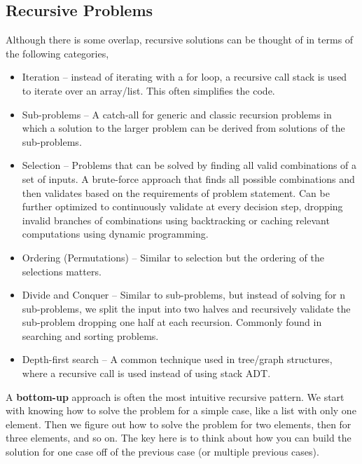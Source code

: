 \documentclass{article}
\begin{document}
    \subsection{Recursive Problems}
    Although there is some overlap, recursive solutions can be thought of in terms of the following categories,
    \begin{itemize}
        \item Iteration -- instead of iterating with a for loop, a recursive call stack is used to iterate over an array/list. This often simplifies the code. 
        \item Sub-problems -- A catch-all for generic and classic recursion problems in which a solution to the larger problem can be derived from solutions of the sub-problems.
        
        \item Selection -- Problems that can be solved by finding all valid combinations of a set of inputs. A brute-force approach that finds all possible combinations and then validates based on the requirements of problem statement. Can be further optimized to continuously validate at every decision step, dropping invalid branches of combinations using backtracking or caching relevant computations using dynamic programming.
        
        \item Ordering (Permutations) -- Similar to selection but the ordering of the selections matters.  
        
        \item Divide and Conquer -- Similar to sub-problems, but instead of solving for n sub-problems, we split the input into two halves and recursively validate the sub-problem dropping one half at each recursion. Commonly found in searching and sorting problems.
        
        \item Depth-first search --  A common technique used in tree/graph structures, where a recursive call is used instead of using stack ADT.
    \end{itemize}
    
    A \textbf{bottom-up} approach is often the most intuitive recursive pattern. We start with knowing how to solve the problem for a simple case, like a list with only one element. Then we figure out how to solve the problem for two elements, then for three elements, and so on. The key here is to think about how you can build the solution for one case off of the previous case (or multiple previous cases). 
    
\end{document}

